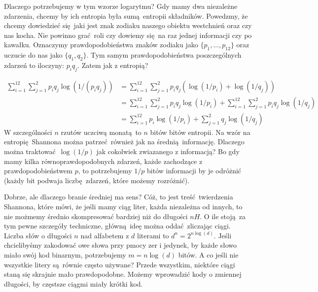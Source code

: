 \documentclass[10pt,a4paper]{article}
\begin{document}

Dlaczego potrzebujemy w tym wzorze logarytmu? 
Gdy mamy dwa niezależne zdarzenia, chcemy by ich entropia była sumą entropii składników.
Powedzmy, że chcemy dowiedzieć się jaki jest znak zodiaku naszego obiektu westchnień oraz czy nas kocha.
Nie powinno grać roli czy dowiemy się na raz jednej informacji czy po kawałku.
Oznaczymy prawdopodobieństwa znaków zodiaku jako $\{p_1, \ldots, p_{12} \}$ oraz uczucie do nas jako $\{q_1, q_2\}$.
Tym samym prawdopodobieństwa poszczególnych zdarzeń to iloczyny: $p_i q_j$.
Zatem jak z entropią?
%
%

\begin{align}
    \sum_{i=1}^{12} \sum_{j=1}^2 p_i q_j \log(1/(p_i q_j))
    &= \sum_{i=1}^{12} \sum_{j=1}^2 p_i q_j \left( \log(1/p_i) + \log(1/q_j) \right)\\
    &= \sum_{i=1}^{12} \sum_{j=1}^2 p_i q_j \log(1/p_i)
    +\sum_{i=1}^{12} \sum_{j=1}^2 p_i q_j \log(1/q_j)\\
    &= \sum_{i=1}^{12} p_i \log(1/p_i)
    + \sum_{j=1}^2 q_j \log(1/q_j)
\end{align}
%
W szczególności $n$ rzutów uczciwą monatą to $n$ bitów bitów entropii.
%
%
Na wzór na entropię Shannona można patrzeć również jak na średnią informację.
Dlaczego można traktować $\log(1/p)$ jak cokolwiek zwiazanego z informacją?
Bo gdy mamy kilka równoprawdopodobnych zdarzeń, każde zachodzące z prawdopodobieństwem $p$,
to potrzebujemy $1/p$ bitów informacji by je odróżnić (każdy bit podwaja liczbę zdarzeń, które możemy rozróżnić).

Dobrze, ale dlaczego branie średniej ma sens?
Cóż, to jest treść twierdzenia Shannona, które mówi, że jeśli mamy ciąg liter,
każda niezależna od innych, to nie możmemy średnio skompresować bardziej niż do długości $n H$.
O ile stoją za tym pewne szczegóły techniczne, główną ideę można oddać zliczając ciągi.
Liczba słów o długości $n$ nad alfabetem z $d$ literami to $d^n=2^{n \log(d)}$.
Jeśli chcielibyśmy zakodować owe słowa przy pmocy zer i jedynek,
by każde słowo miało swój kod binarnym, potrzebujemy $m = n \log(d)$ bitów.
A co jeśli nie wszystkie litery są równie często używane?
Przede wszystkim, niektóre ciągi staną się skrajnie mało prawdopodobne.
Możemy wprowadzić kody o zmiennej długości, by częstsze ciągmi miały krótki kod.
\end{document}
